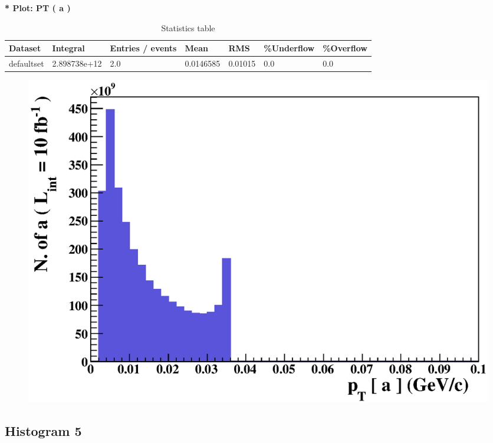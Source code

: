 \documentclass[a4paper, 11pt]{article}
\begin{document}
   \textbf{   * Plot: PT ( a ) }
\textbf{ }\begin{table}[!h]
  \begin{center}
    \caption{ Statistics table}
    \begin{tabular}{|m{17.0mm}|m{27.0mm}|m{23.0mm}|m{18.0mm}|m{18.0mm}|m{14.0mm}|m{14.0mm}|}
      \hline
      \cellcolor{yellow}         Dataset& \cellcolor{yellow}         Integral& \cellcolor{yellow}         Entries /\- events& \cellcolor{yellow}         Mean& \cellcolor{yellow}         RMS& \cellcolor{yellow}         \%Underflow& \cellcolor{yellow}         \%Overflow\\
      \hline
      \cellcolor{white}         defaultset& \cellcolor{white}         2.898738e+12& \cellcolor{white}         2.0& \cellcolor{white}         0.0146585& \cellcolor{white}         0.01015& \cellcolor{green}         0.0& \cellcolor{green}         0.0\\
\hline
    \end{tabular}
  \end{center}
\end{table}

\begin{figure}[!h]
  \begin{center}
    \includegraphics[scale=0.6]{selection_3.eps}\\
\caption{}
  \end{center}
\end{figure}
\newpage
   \newpage
\subsection{ Histogram 5}
\end{document}
